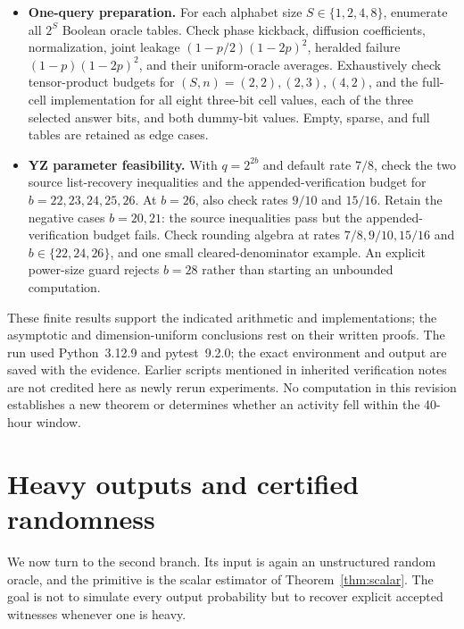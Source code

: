 \documentclass[11pt]{article}
\theoremstyle{definition}\newtheorem{definition}[theorem]{Definition}
\theoremstyle{remark}\newtheorem{remark}[theorem]{Remark}
\begin{document}
\begin{itemize}
\item \textbf{One-query preparation.} For each alphabet size $S\in\{1,2,4,8\}$, enumerate all $2^S$ Boolean oracle tables. Check phase kickback, diffusion coefficients, normalization, joint leakage $(1-p/2)(1-2p)^2$, heralded failure $(1-p)(1-2p)^2$, and their uniform-oracle averages. Exhaustively check tensor-product budgets for $(S,n)=(2,2),(2,3),(4,2)$, and the full-cell implementation for all eight three-bit cell values, each of the three selected answer bits, and both dummy-bit values. Empty, sparse, and full tables are retained as edge cases.
\item \textbf{YZ parameter feasibility.} With $q=2^{2b}$ and default rate $7/8$, check the two source list-recovery inequalities and the appended-verification budget for $b=22,23,24,25,26$. At $b=26$, also check rates $9/10$ and $15/16$. Retain the negative cases $b=20,21$: the source inequalities pass but the appended-verification budget fails. Check rounding algebra at rates $7/8,9/10,15/16$ and $b\in\{22,24,26\}$, and one small cleared-denominator example. An explicit power-size guard rejects $b=28$ rather than starting an unbounded computation.
\end{itemize}

These finite results support the indicated arithmetic and implementations; the asymptotic and dimension-uniform conclusions rest on their written proofs. The run used Python~3.12.9 and pytest~9.2.0; the exact environment and output are saved with the evidence. Earlier scripts mentioned in inherited verification notes are not credited here as newly rerun experiments. No computation in this revision establishes a new theorem or determines whether an activity fell within the 40-hour window.

\section{Heavy outputs and certified randomness}\label{sec:certified}
We now turn to the second branch. Its input is again an unstructured random oracle, and the primitive is the scalar estimator of Theorem~\ref{thm:scalar}. The goal is not to simulate every output probability but to recover explicit accepted witnesses whenever one is heavy.
\end{document}
